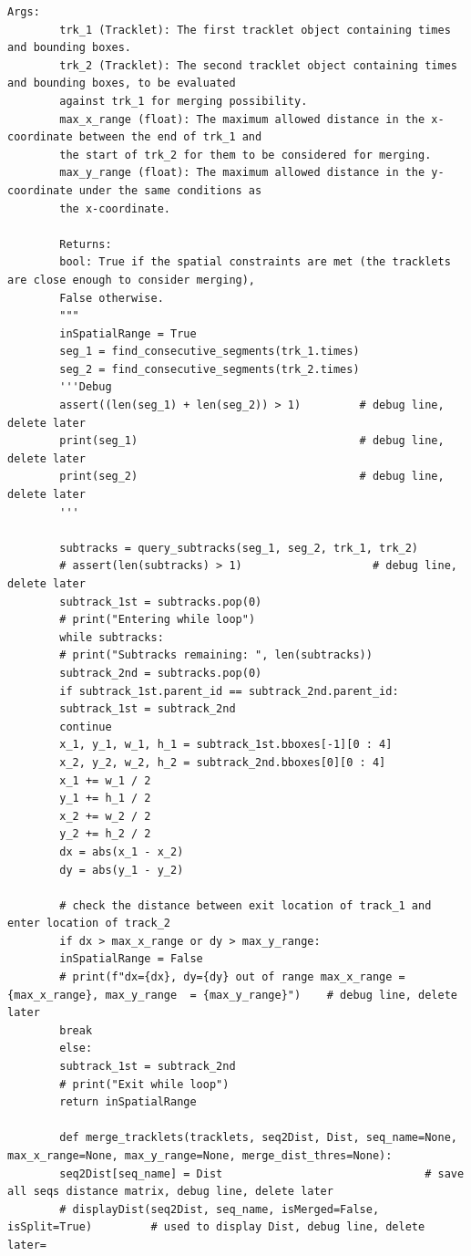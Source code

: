 \documentclass[12pt, a4paper, twoside]{article}
\begin{document}
\begin{lstlisting}[style=pythonstyle]
		Args:
		trk_1 (Tracklet): The first tracklet object containing times and bounding boxes.
		trk_2 (Tracklet): The second tracklet object containing times and bounding boxes, to be evaluated
		against trk_1 for merging possibility.
		max_x_range (float): The maximum allowed distance in the x-coordinate between the end of trk_1 and
		the start of trk_2 for them to be considered for merging.
		max_y_range (float): The maximum allowed distance in the y-coordinate under the same conditions as
		the x-coordinate.
		
		Returns:
		bool: True if the spatial constraints are met (the tracklets are close enough to consider merging),
		False otherwise.
		"""
		inSpatialRange = True
		seg_1 = find_consecutive_segments(trk_1.times)
		seg_2 = find_consecutive_segments(trk_2.times)
		'''Debug
		assert((len(seg_1) + len(seg_2)) > 1)         # debug line, delete later
		print(seg_1)                                  # debug line, delete later
		print(seg_2)                                  # debug line, delete later
		'''
		
		subtracks = query_subtracks(seg_1, seg_2, trk_1, trk_2)
		# assert(len(subtracks) > 1)                    # debug line, delete later
		subtrack_1st = subtracks.pop(0)
		# print("Entering while loop")
		while subtracks:
		# print("Subtracks remaining: ", len(subtracks))
		subtrack_2nd = subtracks.pop(0)
		if subtrack_1st.parent_id == subtrack_2nd.parent_id:
		subtrack_1st = subtrack_2nd
		continue
		x_1, y_1, w_1, h_1 = subtrack_1st.bboxes[-1][0 : 4]
		x_2, y_2, w_2, h_2 = subtrack_2nd.bboxes[0][0 : 4]
		x_1 += w_1 / 2
		y_1 += h_1 / 2
		x_2 += w_2 / 2
		y_2 += h_2 / 2
		dx = abs(x_1 - x_2)
		dy = abs(y_1 - y_2)
		
		# check the distance between exit location of track_1 and enter location of track_2
		if dx > max_x_range or dy > max_y_range:
		inSpatialRange = False
		# print(f"dx={dx}, dy={dy} out of range max_x_range = {max_x_range}, max_y_range  = {max_y_range}")    # debug line, delete later
		break
		else:
		subtrack_1st = subtrack_2nd
		# print("Exit while loop")
		return inSpatialRange
		
		def merge_tracklets(tracklets, seq2Dist, Dist, seq_name=None, max_x_range=None, max_y_range=None, merge_dist_thres=None):
		seq2Dist[seq_name] = Dist                               # save all seqs distance matrix, debug line, delete later
		# displayDist(seq2Dist, seq_name, isMerged=False, isSplit=True)         # used to display Dist, debug line, delete later=
		

\end{lstlisting}
\end{document}
